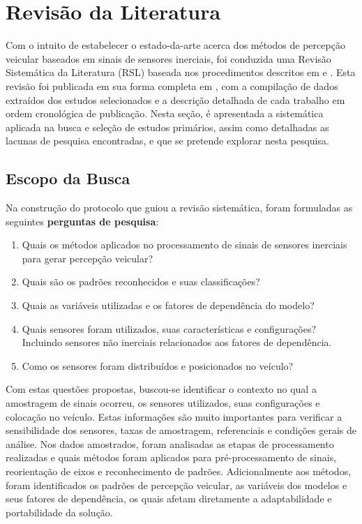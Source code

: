 \chapter{Revisão da Literatura}
\label{cap:revisao}

Com o intuito de estabelecer o estado-da-arte acerca dos métodos de percepção veicular baseados em sinais de sensores inerciais, foi conduzida uma Revisão Sistemática da Literatura (RSL) baseada nos procedimentos descritos em \cite{kitchenham2009} e \cite{biolchini2005}. Esta revisão foi publicada em sua forma completa em \cite{menegazzo2018}, com a compilação de dados extraídos dos estudos selecionados e  a descrição detalhada de cada trabalho em ordem cronológica de publicação. Nesta seção, é apresentada a sistemática aplicada na busca e seleção de estudos primários, assim como detalhadas as lacunas de pesquisa encontradas, e que se pretende explorar nesta pesquisa. 

\section{Escopo da Busca}

Na construção do protocolo que guiou a revisão sistemática, foram formuladas as seguintes \textbf{perguntas de pesquisa}:

\begin{enumerate}
\item Quais os métodos aplicados no processamento de sinais de sensores inerciais para gerar percepção veicular?
\item Quais são os padrões reconhecidos e suas classificações?
\item Quais as variáveis utilizadas e os fatores de dependência do modelo?
\item Quais sensores foram utilizados, suas características e configurações? Incluindo sensores não inerciais relacionados aos fatores de dependência.
\item Como os sensores foram distribuídos e posicionados no veículo?
\end{enumerate}

Com estas questões propostas, buscou-se identificar o contexto no qual a amostragem de sinais ocorreu, os sensores utilizados, suas configurações e colocação no veículo. Estas informações são muito importantes para verificar a sensibilidade dos sensores, taxas de amostragem, referenciais e condições gerais de análise. Nos dados amostrados, foram analisadas as etapas de processamento realizadas e quais métodos foram aplicados para pré-processamento de sinais, reorientação de eixos e reconhecimento de padrões. Adicionalmente aos métodos, foram identificados os padrões de percepção veicular, as variáveis dos modelos e seus fatores de dependência, os quais afetam diretamente a adaptabilidade e portabilidade da solução.

